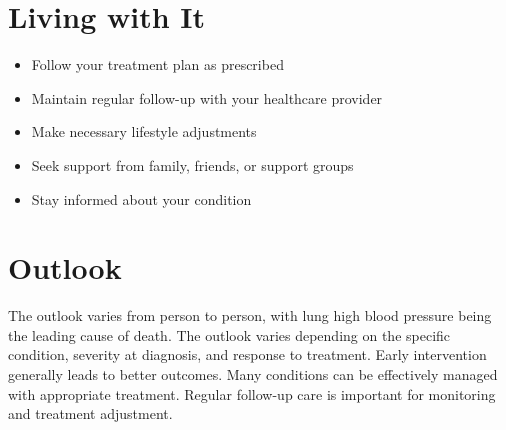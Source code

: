 \section{Living with It}
\begin{itemize}[noitemsep]
  \item Follow your treatment plan as prescribed
  \item Maintain regular follow-up with your healthcare provider
  \item Make necessary lifestyle adjustments
  \item Seek support from family, friends, or support groups
  \item Stay informed about your condition
\end{itemize}
\section{Outlook}
The outlook varies from person to person, with lung high blood pressure being the leading cause of death. The outlook varies depending on the specific condition, severity at diagnosis, and response to treatment. Early intervention generally leads to better outcomes. Many conditions can be effectively managed with appropriate treatment. Regular follow-up care is important for monitoring and treatment adjustment.
